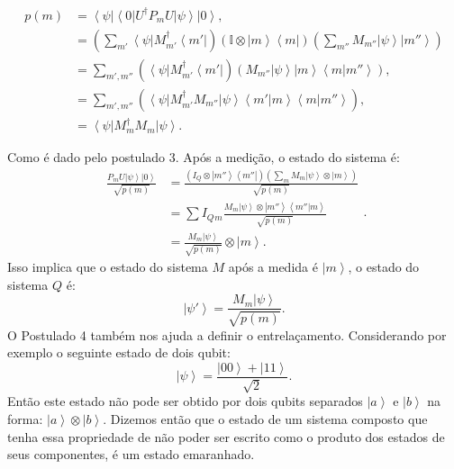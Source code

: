 \begin{equation}
\begin{split}
p\left(m\right) & =\left\langle \psi\right|\left\langle 0\right|U^{\dagger}P_{m}U\left|\psi\right\rangle \left|0\right\rangle , \\
& = \left( \sum_{m'} \left\langle \psi \right| M_{m'}^{\dagger} \left\langle m'\right|\right)\left( \mathbb{I}\otimes\left|m\right\rangle \left\langle m\right|\right)\left( \sum_{m''} M_{m''} \left|\psi\right\rangle \left|m''\right\rangle \right) \\
& =\sum_{m',m''}\left(\left\langle \psi\right|M_{m'}^{\dagger}\left\langle m'\right|\right)\left(M_{m''}\left|\psi\right\rangle \left|m\right\rangle \left\langle m|m''\right\rangle \right), \\
& =\sum_{m',m''}\left(\left\langle \psi\right|M_{m'}^{\dagger}M_{m''}\left|\psi\right\rangle \left\langle m'|m\right\rangle \left\langle m|m''\right\rangle \right), \\
& =\left\langle \psi\right|M_{m}^{\dagger}M_{m}\left|\psi\right\rangle .
\end{split}
\end{equation}

Como é dado pelo postulado 3. Após a medição, o estado do sistema é:
\begin{equation}
\begin{split}
\frac{P_{m}U\left|\psi\right\rangle \left|0\right\rangle }{\sqrt{p\left(m\right)}}& =\frac{\left(I_{Q}\otimes\left|m''\right\rangle \left\langle m''\right|\right)\left(\sum_{m}M_{m}\left|\psi\right\rangle \otimes\left|m\right\rangle \right)}{\sqrt{p\left(m\right)}}\\
 & =\sum I_{Q}{}_{m}\frac{M_{m}\left|\psi\right\rangle \otimes\left|m''\right\rangle \left\langle m''|m\right\rangle }{\sqrt{p\left(m\right)}}\\
& =\frac{M_{m}\left|\psi\right\rangle }{\sqrt{p\left(m\right)}}\otimes\left|m\right\rangle .
\end{split}
. \end{equation}
Isso implica que o estado do sistema $M$ após a medida é $\left|m\right\rangle $, o estado do sistema $Q$ é:
\begin{equation}
\left|\psi'\right\rangle =\frac{M_{m}\left|\psi\right\rangle }{\sqrt{p\left(m\right)}}
. \end{equation}
O Postulado 4 também nos ajuda a definir o entrelaçamento. Considerando por exemplo o seguinte estado de dois qubit:
\begin{equation}
\left|\psi\right\rangle =\frac{\left|00\right\rangle +\left|11\right\rangle }{\sqrt{2}}
. \end{equation}
Então este estado  não pode ser obtido por dois qubits separados $\left|a\right\rangle $ e $\left|b\right\rangle $  na forma: $\left|a\right\rangle \otimes\left|b\right\rangle $. Dizemos então que o estado de um sistema composto que tenha essa propriedade de não poder ser escrito como o produto dos estados de seus componentes, é um estado emaranhado.

